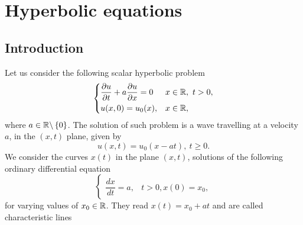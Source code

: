 \newpage
\section{Hyperbolic equations}
\subsection{Introduction}
Let us consider the following scalar hyperbolic problem 
\begin{equation}
    \begin{dcases}
        \partialderivative{u}{t} + a\partialderivative{u}{x} = 0 & x\in \real, \ t > 0, \\
        u(x, 0) = u_0 (x), & x\in \real, 
    \end{dcases}
    \label{1_hyp}
\end{equation}
where \(a \in \mathbb{R} \backslash \left\{ 0 \right\}\). The solution of such problem is a wave travelling at a velocity \(a\), in the \((x,t)\) plane, given by 
\[
    u(x,t) = u_0(x-at), \ t \geq 0.
\]
We consider the curves \(x(t)\) in the plane \((x,t)\), solutions of the following ordinary differential equation 
\begin{equation*}
    \begin{cases}
        \dfrac{dx}{dt} = a, & t>0,
        x(0) = x_0,
    \end{cases}
\end{equation*}
for varying values of \(x_0 \in \mathbb{R}\). They read \(x(t) = x_0 +at\) and are called characteristic lines